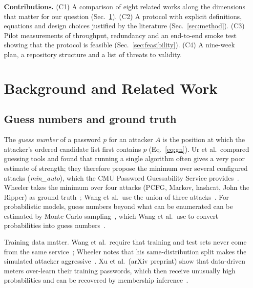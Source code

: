 \documentclass[conference]{IEEEtran}
\begin{document}
\textbf{Contributions.} (C1) A comparison of eight related works along the dimensions that matter for our question (Sec.~\ref{sec:related}). (C2) A protocol with explicit definitions, equations and design choices justified by the literature (Sec.~\ref{sec:method}). (C3) Pilot measurements of throughput, redundancy and an end-to-end smoke test showing that the protocol is feasible (Sec.~\ref{sec:feasibility}). (C4) A nine-week plan, a repository structure and a list of threats to validity.

\section{Background and Related Work}\label{sec:related}

\subsection{Guess numbers and ground truth}
The \emph{guess number} of a password $p$ for an attacker $A$ is the position at which the attacker's ordered candidate list first contains $p$ (Eq.~\ref{eq:gn}). Ur et al.\ compared guessing tools and found that running a single algorithm often gives a very poor estimate of strength; they therefore propose the minimum over several configured attacks (\emph{min\_auto}), which the CMU Password Guessability Service provides~\cite{ur2015,golla2018}. Wheeler takes the minimum over four attacks (PCFG, Markov, hashcat, John the Ripper) as ground truth~\cite{wheeler2016}; Wang et al.\ use the union of three attacks~\cite{wang2023}. For probabilistic models, guess numbers beyond what can be enumerated can be estimated by Monte Carlo sampling~\cite{dellamico2015}, which Wang et al.\ use to convert probabilities into guess numbers~\cite{wang2023}.

Training data matter. Wang et al.\ require that training and test sets never come from the same service~\cite{wang2023}; Wheeler notes that his same-distribution split makes the simulated attacker aggressive~\cite{wheeler2016}. Xu et al.\ (arXiv preprint) show that data-driven meters over-learn their training passwords, which then receive unusually high probabilities and can be recovered by membership inference~\cite{xu2025}.
\end{document}
